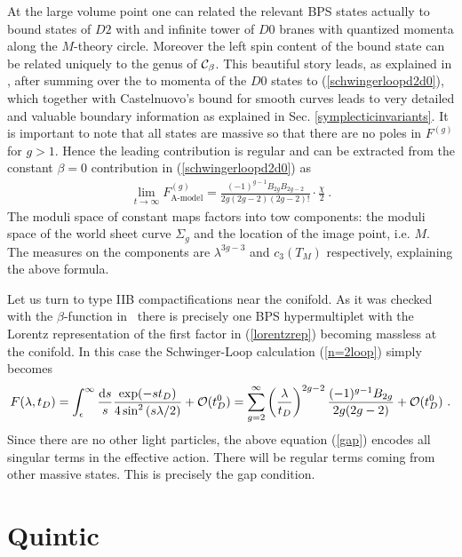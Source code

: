 \documentclass[12pt]{article}
\newcommand{\ds}{\displaystyle}
\begin{document}
At the large volume point one can related the relevant BPS states
actually to bound states of $D2$  with and infinite tower of $D0$
branes with quantized momenta along the $M$-theory circle.
Moreover the left spin content of the bound state can be related
uniquely to the genus of ${\cal C}_\beta$. This beautiful story
leads, as explained in \cite{GVI,GVII}, after summing over the to
momenta of the $D0$ states  to (\ref{schwingerloopd2d0}), which
together with Castelnuovo's bound for smooth curves leads to very
detailed and valuable boundary information as explained in Sec.
\ref{symplecticinvariants}. It is important to note that all
states are massive so that there are no poles in $F^{(g)}$ for
$g>1$. Hence the leading contribution is regular and can be
extracted from the constant $\beta=0$  contribution in
(\ref{schwingerloopd2d0}) as
\begin{eqnarray} \label{constantmap}
\lim_{t\rightarrow
\infty}F^{(g)}_{\textrm{A-model}}=\frac{(-1)^{g-1}B_{2g}B_{2g-2}}{2g(2g-2)(2g-2)!}\cdot \frac{\chi}{2}\ .
\label{constantmaps}
\end{eqnarray}
The moduli space of constant maps factors into tow components: the
moduli space of the world sheet curve $\Sigma_g$ and the location
of the image point, i.e. $M$. The measures on the components are
$\lambda^{3g-3}$ and $c_3(T_M)$ respectively, explaining the above
formula.

Let us turn to type IIB compactifications near the conifold. As it was checked
with the $\beta$-function  in~\cite{Vafa:1995ta} there is precisely one
BPS hypermultiplet with the Lorentz representation of the
first factor in (\ref{lorentzrep}) becoming massless at the conifold. In this case
the Schwinger-Loop calculation (\ref{n=2loop}) simply becomes
\begin{equation}
F(\lambda, t_D)=\int_{\epsilon}^\infty \frac{{\rm d} s}{s} \ds{{
\exp({- s t_D })} \over 4 \sin^2\ds{\left( s \lambda
/2\right)}}+{\cal O}(t_D^0) =\sum_{g=2}^\infty \left(\lambda\over
t_D\right)^{2g-2} \frac{(-1)^{g-1} B_{2g}}{2 g (2 g-2)}+{\cal
O}(t_D^0)\ . \label{gap}
\end{equation}
Since there are no other light particles, the above equation
(\ref{gap}) encodes all singular terms in the effective action.
There will be regular terms coming from other massive states. This
is precisely the gap condition.



\section{Quintic}
\label{quintic}
\end{document}
